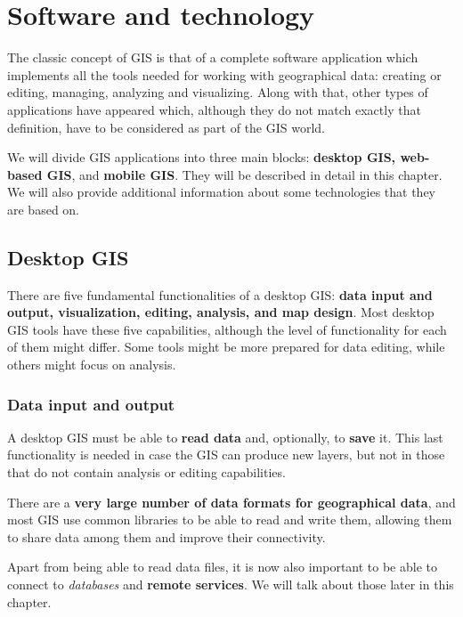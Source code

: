 
\chapter{Software and technology}

\pagestyle{fancy}

The classic concept of GIS is that of a complete software application which implements all the tools needed for working with geographical data: creating or editing, managing, analyzing and visualizing. Along with that, other types of applications have appeared which, although they do not match exactly that definition, have to be considered as part of the GIS world.

We will divide GIS applications into three main blocks: \textbf{desktop GIS, web-based GIS}, and \textbf{mobile GIS}. They will be described in detail in this chapter. We will also provide additional information about some technologies that they are based on.


\section{Desktop GIS}

There are five fundamental functionalities of a desktop GIS: \textbf{data input and output, visualization, editing, analysis, and map design}. Most desktop GIS tools have these five capabilities, although the level of functionality for each of them might differ. Some tools might be more prepared for data editing, while others might focus on analysis.

\subsection{Data input and output}

A desktop GIS must be able to \textbf{read data} and, optionally, to \textbf{save} it. This last functionality is needed in case the GIS can produce new layers, but not in those that do not contain analysis or editing capabilities.

There are a \textbf{very large number of data formats for geographical data}, and most GIS use common libraries to be able to read and write them, allowing them to share data among them and improve their connectivity.

Apart from being able to read data files, it is now also important to be able to connect to \emph{databases} and \textbf{remote services}. We will talk about those later in this chapter.

